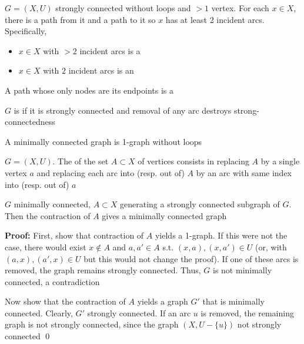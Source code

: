 \documentclass[aspectratio=43]{beamer}
\begin{document}
\begin{frame}
\begin{definition}
$G=(X,U)$ strongly connected without loops and $>1$ vertex. For each $x\in X$, there is a path from it and a path to it so $x$ has at least 2 incident arcs. Specifically,
\begin{itemize}
\item $x\in X$ with $>2$ incident arcs is a 
\item $x\in X$ with $2$ incident arcs is an 
\end{itemize}
A path whose only nodes are its endpoints is a 
\end{definition}
\vfill
\begin{definition}
$G$ is  if it is strongly connected and removal of any arc destroys strong-connectedness
\end{definition}
A minimally connected graph is 1-graph without loops
\vfill
\begin{definition}[Contraction]
$G=(X,U)$. The  of the set $A\subset X$ of vertices consists in replacing $A$ by a single vertex $a$ and replacing each arc into (resp. out of) $A$ by an arc with same index into (resp. out of) $a$
\end{definition}
\end{frame}


\begin{frame}
\begin{theorem}
$G$ minimally connected, $A\subset X$ generating a strongly connected subgraph of $G$. Then the contraction of $A$ gives a minimally connected graph
\end{theorem}
\vfill
\textbf{Proof:}
First, show that contraction of $A$ yields a 1-graph. 
If this were not the case, there would exist $x\not\in A$ and $a,a'\in A$ s.t. $(x,a),(x,a')\in U$ (or, with $(a,x),(a',x)\in U$ but this would not
change the proof). 
If one of these arcs is removed, the graph remains strongly
connected. Thus, $G$ is not minimally connected, a contradiction

\vskip1cm
Now show that the contraction of $A$ yields a graph $G'$ that is minimally connected. Clearly, $G'$ strongly connected. If an arc $u$ is removed, the remaining graph is not strongly connected, since the graph
$(X,U-\{u\})$ not strongly connected \qed
\end{frame}
\end{document}
